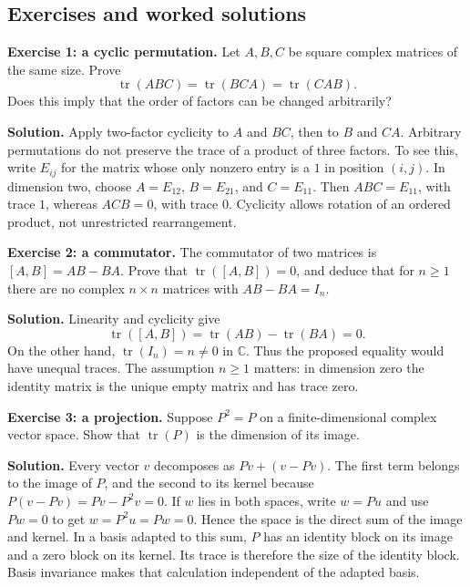 \subsection{Exercises and worked solutions}\label{v1a-ch00-matrix-exercises}

\textbf{Exercise 1: a cyclic permutation.} Let $A,B,C$ be square complex matrices of the same size. Prove
\[
\operatorname{tr}(ABC)=\operatorname{tr}(BCA)
=\operatorname{tr}(CAB).
\]
Does this imply that the order of factors can be changed arbitrarily?

\textbf{Solution.} Apply two-factor cyclicity to $A$ and $BC$, then to $B$ and $CA$. Arbitrary permutations do not preserve the trace of a product of three factors. To see this, write $E_{ij}$ for the matrix whose only nonzero entry is a $1$ in position $(i,j)$. In dimension two, choose $A=E_{12}$, $B=E_{21}$, and $C=E_{11}$. Then $ABC=E_{11}$, with trace $1$, whereas $ACB=0$, with trace $0$. Cyclicity allows rotation of an ordered product, not unrestricted rearrangement.

\textbf{Exercise 2: a commutator.} The commutator of two matrices is $[A,B]=AB-BA$. Prove that $\operatorname{tr}([A,B])=0$, and deduce that for $n\geq1$ there are no complex $n\times n$ matrices with $AB-BA=I_n$.

\textbf{Solution.} Linearity and cyclicity give
\[
\operatorname{tr}([A,B])=\operatorname{tr}(AB)-\operatorname{tr}(BA)=0.
\]
On the other hand, $\operatorname{tr}(I_n)=n\ne0$ in $\mathbb C$. Thus the proposed equality would have unequal traces. The assumption $n\geq1$ matters: in dimension zero the identity matrix is the unique empty matrix and has trace zero.

\textbf{Exercise 3: a projection.} Suppose $P^2=P$ on a finite-dimensional complex vector space. Show that $\operatorname{tr}(P)$ is the dimension of its image.

\textbf{Solution.} Every vector $v$ decomposes as $Pv+(v-Pv)$. The first term belongs to the image of $P$, and the second to its kernel because $P(v-Pv)=Pv-P^2v=0$. If $w$ lies in both spaces, write $w=Pu$ and use $Pw=0$ to get $w=P^2u=Pw=0$. Hence the space is the direct sum of the image and kernel. In a basis adapted to this sum, $P$ has an identity block on its image and a zero block on its kernel. Its trace is therefore the size of the identity block. Basis invariance makes that calculation independent of the adapted basis.
